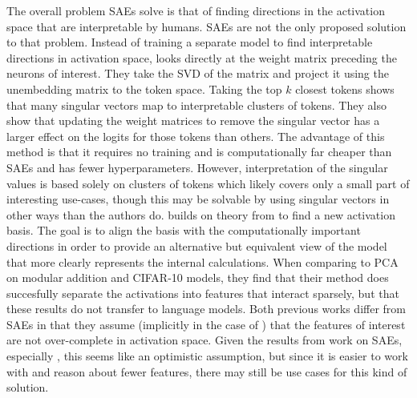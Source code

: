 The overall problem SAEs solve is that of finding directions in the activation space that are interpretable by humans.
SAEs are not the only proposed solution to that problem.
Instead of training a separate model to find interpretable directions in activation space, \textcite{millidge_singular_2022} looks directly at the weight matrix preceding the neurons of interest.
They take the SVD of the matrix and project it using the unembedding matrix to the token space.
Taking the top $k$ closest tokens shows that many singular vectors map to interpretable clusters of tokens.
They also show that updating the weight matrices to remove the singular vector has a larger effect on the logits for those tokens than others.
The advantage of this method is that it requires no training and is computationally far cheaper than SAEs and has fewer hyperparameters.
However, interpretation of the singular values is based solely on clusters of tokens which likely covers only a small part of interesting use-cases,
though this may be solvable by using singular vectors in other ways than the authors do.
\textcite{bushnaq_local_2024} builds on theory from \textcite{bushnaq_using_2024} to find a new activation basis.
The goal is to align the basis with the computationally important directions in order to provide an alternative but equivalent view of the model that more clearly represents the internal calculations.
When comparing to PCA on modular addition and CIFAR-10 models, they find that their method does succesfully separate the activations into features that interact sparsely, but that these results do not transfer to language models.
Both previous works differ from SAEs in that they assume (implicitly in the case of \textcite{millidge_singular_2022}) that the features of interest are not over-complete in activation space.
Given the results from work on SAEs, especially \textcite{templeton_scaling_2024}, this seems like an optimistic assumption, but since it is easier to work with and reason about fewer features, there may still be use cases for this kind of solution.

